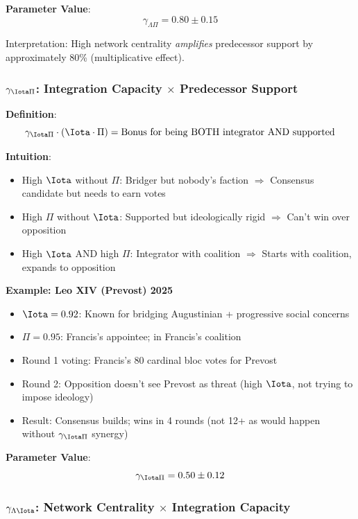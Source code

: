 \documentclass[11pt]{article}
\begin{document}
\textbf{Parameter Value}:
$$\gamma_{\Lambda\Pi} = 0.80 \pm 0.15$$

Interpretation: High network centrality \textit{amplifies} predecessor support by approximately 80\% (multiplicative effect).

\subsubsection{$\gamma_{\Iota\Pi}$: Integration Capacity $\times$ Predecessor Support}

\textbf{Definition}:
$$\gamma_{\Iota\Pi} \cdot (\Iota \cdot \Pi) = \text{Bonus for being BOTH integrator AND supported}$$

\textbf{Intuition}:

\begin{itemize}
\item High $\Iota$ without $\Pi$: Bridger but nobody's faction $\Rightarrow$ Consensus candidate but needs to earn votes
\item High $\Pi$ without $\Iota$: Supported but ideologically rigid $\Rightarrow$ Can't win over opposition
\item High $\Iota$ AND high $\Pi$: Integrator with coalition $\Rightarrow$ Starts with coalition, expands to opposition
\end{itemize}

\textbf{Example: Leo XIV (Prevost) 2025}

\begin{itemize}
\item $\Iota = 0.92$: Known for bridging Augustinian + progressive social concerns
\item $\Pi = 0.95$: Francis's appointee; in Francis's coalition
\item Round 1 voting: Francis's 80 cardinal bloc votes for Prevost
\item Round 2: Opposition doesn't see Prevost as threat (high $\Iota$, not trying to impose ideology)
\item Result: Consensus builds; wins in 4 rounds (not 12+ as would happen without $\gamma_{\Iota\Pi}$ synergy)
\end{itemize}

\textbf{Parameter Value}:
$$\gamma_{\Iota\Pi} = 0.50 \pm 0.12$$

\subsubsection{$\gamma_{\Lambda\Iota}$: Network Centrality $\times$ Integration Capacity}
\end{document}
